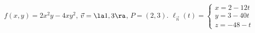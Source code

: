 {$f(x,y) = 2x^2y-4xy^2$,  $\vec v = \la 1,3\ra$, $P=(2,3)$.\label{12_06_ex_09}
}
{
	$\ell_{\vec n}(t) = \left\{\begin{array}{l} x=2-12t\\ y=3-40t \\ z = -48-t\end{array}\right.$
}